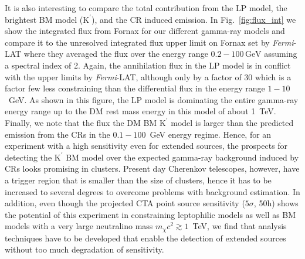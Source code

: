\documentclass[10pt,aps,pra,reprint,amsmath,amsfonts,amssymb,showpacs,nofootinbib,floatfix]{revtex4-1}
\newcommand{\Fermi}{{\em Fermi}\xspace}
\newcommand{\rmn}{\mathrm}
\newcommand{\Kp}{\rmn{K}^\prime}
\newcommand{\gev}{\rmn{GeV}}
\begin{document}
It is also interesting to compare the total contribution from the LP
model, the brightest BM model ($\Kp$), and the CR induced emission. In
Fig.~\ref{fig:flux_int} we show the integrated flux from Fornax for
our different gamma-ray models and compare it to the unresolved
integrated flux upper limit on Fornax set by \Fermi-LAT where they
averaged the flux over the energy range $0.2-100\,\gev$ assuming a
spectral index of 2. Again, the annihilation flux in the LP model is
in conflict with the upper limits by \Fermi-LAT, although only by a
factor of 30 which is a factor few less constraining than the
differential flux in the energy range $1-10$~GeV. As shown in this
figure, the LP model is dominating the entire gamma-ray energy range
up to the DM rest mass energy in this model of about 1~TeV. Finally,
we note that the flux the DM BM $\Kp$ model is larger than the
predicted emission from the CRs in the $0.1-100$~GeV energy
regime. Hence, for an experiment with a high sensitivity even for
extended sources, the prospects for detecting the $\Kp$ BM model over
the expected gamma-ray background induced by CRs looks promising in
clusters. Present day Cherenkov telescopes, however, have a trigger
region that is smaller than the size of clusters, hence it has to be
increased to several degrees to overcome problems with background
estimation. In addition, even though the projected CTA point source
sensitivity ($5\sigma$, 50h) shows the potential of this experiment in
constraining leptophilic models as well as BM models with a very large
neutralino mass $m_\chi c^2 \gtrsim 1$~TeV, we find that analysis
techniques have to be developed that enable the detection of extended
sources without too much degradation of sensitivity.
\end{document}
